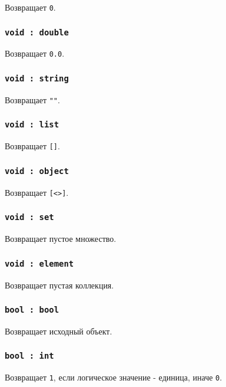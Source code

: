 \documentclass[a4paper, 14pt]{extarticle}
\begin{document}
Возвращает \lstinline|0|.

\subsubsection{\lstinline|void : double|}

Возвращает \lstinline|0.0|.

\subsubsection{\lstinline|void : string|}

Возвращает \lstinline|""|.

\subsubsection{\lstinline|void : list|}

Возвращает \lstinline|[]|.

\subsubsection{\lstinline|void : object|}

Возвращает \lstinline|[<>]|.

\subsubsection{\lstinline|void : set|}

Возвращает пустое множество.

\subsubsection{\lstinline|void : element|}

Возвращает пустая коллекция.

\subsubsection{\lstinline|bool : bool|}

Возвращает исходный объект.

\subsubsection{\lstinline|bool : int|}

Возвращает \lstinline|1|, если логическое значение - единица, иначе \lstinline|0|.
\end{document}
